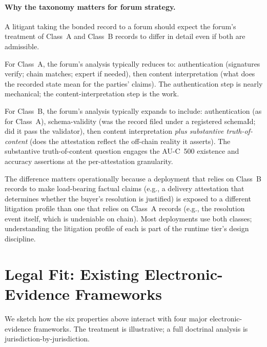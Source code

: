\documentclass[11pt,a4paper]{article}
\theoremstyle{remark}
\begin{document}
\paragraph{Why the taxonomy matters for forum strategy.}
A litigant taking the bonded record to a forum should expect the
forum's treatment of Class~A and Class~B records to differ in
detail even if both are admissible.

For Class~A, the forum's analysis typically reduces to:
authentication (signatures verify; chain matches; expert if
needed), then content interpretation (what does the recorded
state mean for the parties' claims). The authentication step is
nearly mechanical; the content-interpretation step is the work.

For Class~B, the forum's analysis typically expands to include:
authentication (as for Class~A), schema-validity (was the record
filed under a registered schemaId; did it pass the validator),
then content interpretation \emph{plus substantive truth-of-content}
(does the attestation reflect the off-chain reality it asserts).
The substantive truth-of-content question engages the AU-C~500
existence and accuracy assertions at the per-attestation
granularity.

The difference matters operationally because a deployment that
relies on Class~B records to make load-bearing factual claims
(e.g., a delivery attestation that determines whether the
buyer's resolution is justified) is exposed to a different
litigation profile than one that relies on Class~A records (e.g.,
the resolution event itself, which is undeniable on chain). Most
deployments use both classes; understanding the litigation
profile of each is part of the runtime tier's design discipline.

\section{Legal Fit: Existing Electronic-Evidence Frameworks}
\label{sec:legal-fit}

We sketch how the six properties above interact with four major
electronic-evidence frameworks. The treatment is illustrative; a
full doctrinal analysis is jurisdiction-by-jurisdiction.
\end{document}
